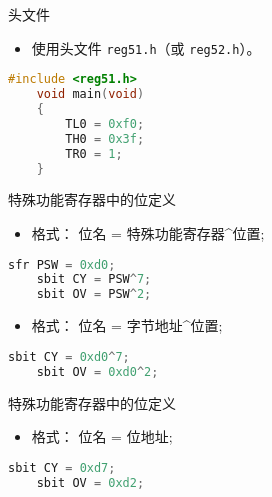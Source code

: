 \documentclass{beamer}
\begin{document}
\begin{frame}[fragile]{头文件}
    \begin{itemize}

        \item
            使用头文件 \texttt{reg51.h}（或 \texttt{reg52.h}）。
    \end{itemize}

    \begin{lstlisting}[language=C]
    #include <reg51.h>
    void main(void)
    {
        TL0 = 0xf0;
        TH0 = 0x3f;
        TR0 = 1;
    }
    \end{lstlisting}

\end{frame}

\begin{frame}[fragile]{特殊功能寄存器中的位定义}
    \begin{itemize}

        \item
            格式： 位名 = 特殊功能寄存器\^{}位置;
    \end{itemize}

    \begin{lstlisting}[language=C]
    sfr PSW = 0xd0;
    sbit CY = PSW^7;
    sbit OV = PSW^2;
    \end{lstlisting}

    \begin{itemize}

        \item
            格式： 位名 = 字节地址\^{}位置;
    \end{itemize}

    \begin{lstlisting}[language=C]
    sbit CY = 0xd0^7;
    sbit OV = 0xd0^2;
    \end{lstlisting}

\end{frame}

\begin{frame}[fragile]{特殊功能寄存器中的位定义}
    \begin{itemize}

        \item
            格式： 位名 = 位地址;
    \end{itemize}

    \begin{lstlisting}[language=C]
    sbit CY = 0xd7;
    sbit OV = 0xd2;
    \end{lstlisting}
\end{frame}
\end{document}
